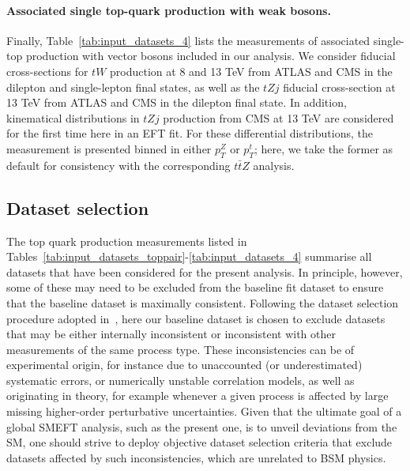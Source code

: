 \documentclass[withindex,glossary]{cam-thesis}
\begin{document}
\paragraph{Associated single top-quark production with weak bosons.}
%
Finally, Table~\ref{tab:input_datasets_4}
lists the measurements of associated single-top production with vector bosons
included in  our analysis.
%
We consider fiducial cross-sections for $tW$ production at 8 and 13 TeV
from ATLAS and CMS in the dilepton and single-lepton final states,
as well as the $tZj$ fiducial cross-section at 13 TeV from ATLAS and CMS in
the dilepton final state.
%
In addition, kinematical distributions in $tZj$ production from CMS
at 13 TeV are considered
 for the first time here in an EFT fit.
%
 For these differential distributions, the measurement is presented binned in either $p_T^Z$ or $p_T^t$;
 here, we take the former as default for consistency with the corresponding $t\bar{t}Z$ analysis.




\clearpage

\subsection{Dataset selection}
\label{sec:dataselection}

The top quark production measurements listed in
Tables~\ref{tab:input_datasets_toppair}-\ref{tab:input_datasets_4} 
summarise all datasets that have been considered for the present analysis.
In principle, however, some of these may need to be excluded from the baseline 
fit dataset to ensure that the baseline dataset is maximally consistent.
%
Following the dataset selection procedure adopted
in~\cite{NNPDF:2021njg}, here our baseline dataset is chosen to exclude datasets that may be either internally
inconsistent or inconsistent with other measurements of the same process type.
%
These inconsistencies can be of experimental origin, for instance due to
unaccounted (or underestimated) systematic errors,
or numerically unstable correlation models, as well as originating in theory,
for example whenever a given process is affected
by large missing higher-order perturbative uncertainties.
%
Given that the ultimate goal of a global SMEFT analysis, such as the present one,
is to unveil deviations from the SM, one should strive to deploy
objective dataset selection criteria that exclude datasets affected by such
inconsistencies, which are unrelated to BSM physics.
\end{document}
